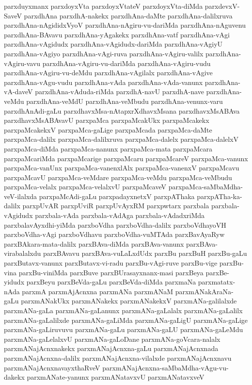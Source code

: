{parxduyxmanx
parxdoyxVta
parxdoyxVtateV
parxdoyxVta-diMda
parxdevxV-SaveV
parxdhAna
parxdhA-nakekx
parxdhAna-daMte
parxdhAna-dalilxruva
parxdhAna-nAgididxVyoV
parxdhAna-nAgiru-vu-dariMda
parxdhAna-nAguvenu
parxdhAna-BAvavu
parxdhAna-yAgakekx
parxdhAna-vatf
parxdhAna-vAgi
parxdhAna-vAgidudx
parxdhAna-vAgidudx-dariMda
parxdhAna-vAgiyU
parxdhAna-vAgiyo
parxdhAna-vAgi-ruva
parxdhAna-vAgiru-valilx
parxdhAna-vAgiru-vavu
parxdhAna-vAgiru-vu-dariMda
parxdhAna-vAgiru-vudu
parxdhAna-vAgiru-vu-deMdu
parxdhAna-vAgilalx
parxdhAna-vAgive
parxdhAna-vAgu-vudu
parxdhAna-vAda
parxdhAna-vAda-vanunx
parxdhAna-vA-daveV
parxdhAna-vAduda-riMda
parxdhA-navU
parxdhA-nave
parxdhAna-veMdu
parxdhAna-veMdU
parxdhAna-veMbudu
parxdhAna-venunx-varu
parxdhAnAdi-gaLu
parxdhavxMsa-nAtapxrXdhavxMsana
parxdhavxMsABAva
parxdhavxMsABAvavU
parxpaMca
parxpaMcakUkx
parxpaMcakekx
parxpaMcakekxV
parxpaMca-gaLige
parxpaMcada
parxpaMca-daMte
parxpaMca-dalilx
parxpaMca-dalilxruva
parxpaMca-dalelx
parxpaMca-dalelxV
parxpaMca-diMda
parxpaMca-nanunx
parxpaMca-mata
parxpaMcara
parxpaMcariMda
parxpaMcarige
parxpaMcaru
parxpaMcareV
parxpaMca-vanunx
parxpaMca-vanUnx
parxpaMca-vanenxlAlx
parxpaMca-vanenxV
parxpaMcavu
parxpaMcavU
parxpaMca-veMdare
parxpaMca-veMdu
parxpaMca-veMbudu
parxpaMca-velalx
parxpaMca-velalxvU
parxpaMcaveV
parxpaMca-saMbaMdha-veV-ilalxda
parxpaMcAdi-gaLu
parxpadayxnetxV
parxpAThaka
parxpATha-ka-dalilx
parxpUvAR
parxpUviR
parxpUvAyxRM
parxpwtarx
parxbala
parxbala-vAgidudx
parxbala-vAda
parxbala-vAdAga
parxbala-vAdadxriMda
parxbalavAyxdhi-yiMda
parxboVdha
parxboVdha-dalilx
parxboVdhayoVH
parxboVdha-vAgi
parxboVdhavu
parxboVdha-vuMTAda
parxBavAyaRyw
parxBAkara-mata-dalilx
parxBAva-diMda
parxBAva-vanunx
parxBAva-virabalalxdu
parxBAvavu
parxBAva-vuLaLxdUdx
parxBu
parxBuH
parxBu-gaLu
parxButavx-vanunx
parxButavx-vi-radu
parxBu-vAgi-ruve
parxBu-vige
parxBu-vina
parxBu-viniMda
parxBuve
parxBUrasayxnanx-masi
parxBeya
parxBe-yidudx
parxBeyu
parxBeVda-gaLu
parxBeVda-diMda
parxmaNa
parxmatatx-nAda
parxmA
parxmAjAcnxna
parxmANa
parxmANaM
parxmANakAraNa-gaLu
parxmANakUkx
parxmANakekx
parxmANakekxV
parxmANa-galilalxde
parxmANa-gaLa
parxmANa-gaLanunx
parxmANa-gaLalalx
parxmANa-gaLalilx
parxmANa-gaLalilxde
parxmANa-gaLiMda
parxmANa-gaLigU
parxmANa-gaLige
parxmANa-gaLiruvuvu
parxmANa-gaLu
parxmANa-gaLU
parxmANa-gaLeMdu
parxmANa-gaLelalxvU
parxmANa-gaLoDane
parxmANa-goVcara-nalalx
parxmANajAcnxnakekx
parxmANajAcnxna-gaLu
parxmANajAcnxnada
parxmANajAcnxna-dalilx
parxmANajAcnxna-vilalxde
parxmANajAcnxnavu
parxmANajAcnxnavayxthaRveV
parxmANajAcnxna-saMbaMdha-vAgu-vu-dakekx
parxmANate-yanunx
parxmANatavxvU
parxmANatavxveV
}
